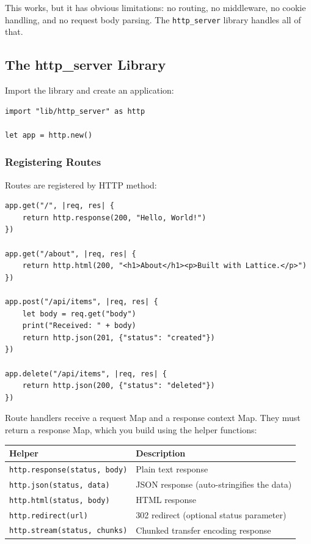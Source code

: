 This works, but it has obvious limitations: no routing, no middleware, no
cookie handling, and no request body parsing. The \texttt{http\_server}
library handles all of that.

\subsection{The http\_server Library}\label{sec:http-server-lib}


Import the library and create an application:

\begin{lstlisting}[language=Lattice, caption={Creating an HTTP server with the http\_server library}]
import "lib/http_server" as http

let app = http.new()
\end{lstlisting}

\subsubsection{Registering Routes}

Routes are registered by HTTP method:

\begin{lstlisting}[language=Lattice, caption={Registering route handlers}]
app.get("/", |req, res| {
    return http.response(200, "Hello, World!")
})

app.get("/about", |req, res| {
    return http.html(200, "<h1>About</h1><p>Built with Lattice.</p>")
})

app.post("/api/items", |req, res| {
    let body = req.get("body")
    print("Received: " + body)
    return http.json(201, {"status": "created"})
})

app.delete("/api/items", |req, res| {
    return http.json(200, {"status": "deleted"})
})
\end{lstlisting}

Route handlers receive a request Map and a response context Map. They must
return a response Map, which you build using the helper functions:

\begin{center}
\begin{tabular}{lp{8cm}}
\toprule
\textbf{Helper} & \textbf{Description} \\
\midrule
\lstinline|http.response(status, body)| & Plain text response \\
\lstinline|http.json(status, data)| & JSON response (auto-stringifies the data) \\
\lstinline|http.html(status, body)| & HTML response \\
\lstinline|http.redirect(url)| & 302 redirect (optional status parameter) \\
\lstinline|http.stream(status, chunks)| & Chunked transfer encoding response \\
\bottomrule
\end{tabular}
\end{center}

